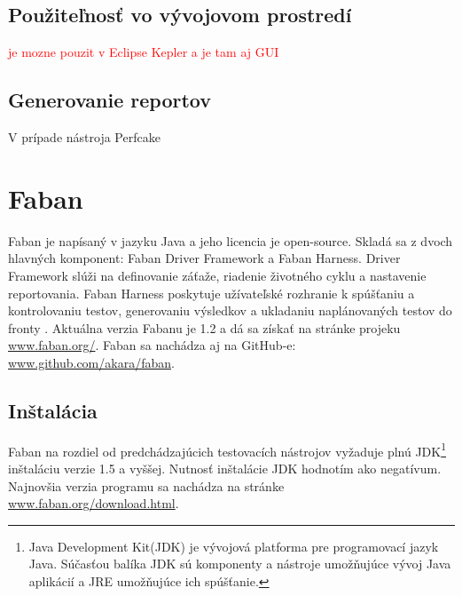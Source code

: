 \documentclass[12pt,oneside,final]{fithesis-utf8}
\newcommand\todo[1]{\textcolor{red}{#1}}
\begin{document}
\subsection{Použiteľnosť vo vývojovom prostredí}
\todo{je mozne pouzit v Eclipse Kepler a je tam aj GUI}

\subsection{Generovanie reportov}
V prípade nástroja Perfcake 

\newpage
\section{Faban}
Faban je napísaný v jazyku Java a jeho licencia je open-source. Skladá sa z dvoch hlavných komponent: Faban Driver Framework a Faban Harness. Driver Framework slúži na definovanie záťaže, riadenie životného cyklu a nastavenie reportovania. Faban Harness poskytuje užívateľské rozhranie k spúšťaniu a kontrolovaniu testov, generovaniu výsledkov a ukladaniu naplánovaných testov do fronty \cite{Faban}. Aktuálna verzia  Fabanu je 1.2 a dá sa získať na stránke projeku \url{www.faban.org/}. Faban sa nachádza aj na GitHub-e: \url{www.github.com/akara/faban}.

\subsection{Inštalácia}
Faban na rozdiel od predchádzajúcich testovacích nástrojov vyžaduje plnú JDK\footnote{Java Development Kit(JDK) je vývojová platforma pre programovací jazyk Java. Súčasťou balíka JDK sú komponenty a nástroje umožňujúce vývoj Java aplikácií a JRE umožňujúce ich spúšťanie.} inštaláciu verzie 1.5 a vyššej. Nutnosť inštalácie JDK hodnotím ako negatívum. Najnovšia verzia programu sa nachádza na stránke \url{www.faban.org/download.html}.
\end{document}
